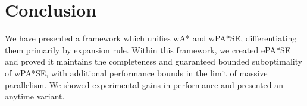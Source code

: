 \documentclass[letterpaper]{article}
\begin{document}
\section{Conclusion}

We have presented a framework which unifies wA* and wPA*SE, differentiating them primarily by expansion rule. Within this framework, we created ePA*SE and proved it maintains the completeness and guaranteed bounded suboptimality of wPA*SE, with additional performance bounds in the limit of massive parallelism. We showed experimental gains in performance and presented an anytime variant.

\end{document}
